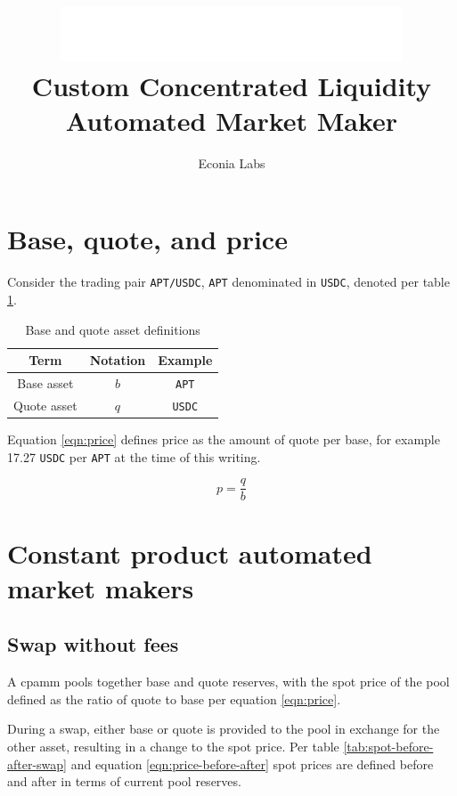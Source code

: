 \documentclass[table, twocolumn]{article}
\title{%
  \includegraphics[width=4in]{../../../../.assets/white-econia-primary-logo.png}\\[10pt]
  Custom Concentrated Liquidity Automated Market Maker
}
\author{Econia Labs}
\date{}
\begin{document}
\maketitle

\section{Base, quote, and price}

Consider the trading pair \texttt{APT/USDC}, \texttt{APT} denominated in \texttt{USDC}, denoted per
table \ref{tab:base-quote-definition}.

\begin{table}[!htb]
  \centering
  \begin{tabular}{|c|c|c|}
    \hline \rowcolor{blue}
    Term        & Notation & Example       \\ \hline
    Base asset  & $b$      & \texttt{APT}  \\ \hline
    Quote asset & $q$      & \texttt{USDC} \\ \hline
  \end{tabular}
  \caption{Base and quote asset definitions}
  \label{tab:base-quote-definition}
\end{table}

Equation \ref{eqn:price} defines price as the amount of quote per base, for example 17.27
\texttt{USDC} per \texttt{APT} at the time of this writing.

\begin{equation} \label{eqn:price}
  p = \frac{q}{b}
\end{equation}

\section{Constant product automated market makers}

\subsection{Swap without fees}

A \gls{cpamm} pools together base and quote reserves, with the spot price of the pool defined as the
ratio of quote to base per equation \ref{eqn:price}.

During a swap, either base or quote is provided to the pool in exchange for the other asset,
resulting in a change to the spot price. Per table \ref{tab:spot-before-after-swap} and equation
\ref{eqn:price-before-after} spot prices are defined before and after in terms of current pool
reserves.
\end{document}
